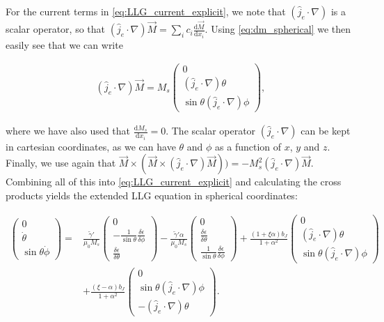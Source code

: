 \documentclass[1p]{elsarticle}		%
\numberwithin{equation}{section}
\begin{document}
For the current terms in \eqref{eq:LLG_current_explicit}, we note that $(\hat{j}_e\cdot\nabla)$ is a scalar operator, so that $(\hat{j}_e\cdot\nabla)\vec{M} = \sum_i c_i \frac{\textrm{d} \vec{M}}{\textrm{d} x_i}$. Using \eqref{eq:dm_spherical} we then easily see that we can write

\begin{align}
(\hat{j}_e\cdot\nabla)\vec{M} = M_s
\begin{pmatrix}
0 \\ 
(\hat{j}_e\cdot\nabla)\theta \\ 
\sin\theta(\hat{j}_e\cdot\nabla)\phi
\end{pmatrix},
\end{align}

where we have also used that $\frac{\textrm{d} M_s}{\textrm{d} x_i} = 0$. The scalar operator $(\hat{j}_e\cdot\nabla)$ can be kept in cartesian coordinates, as we can have $\theta$ and $\phi$ as a function of $x$, $y$ and $z$. Finally, we use again that $\vec{M}\times (\vec{M}\times(\hat{j}_e\cdot\nabla)\vec{M})) = -M_s^2(\hat{j}_e\cdot\nabla)\vec{M}$. Combining all of this into \eqref{eq:LLG_current_explicit} and calculating the cross products yields the extended LLG equation in spherical coordinates:

\begin{align}
\nonumber \begin{pmatrix}
0 \\ \dot{\theta} \\ \sin\theta\dot{\phi}
\end{pmatrix} =
&\frac{\tilde{\gamma}'}{\mu_0 M_s}
\begin{pmatrix}
0 \\ -\frac{1}{\sin\theta} \frac{\delta \epsilon}{\delta \phi} \\ \frac{\delta \epsilon}{\delta \theta}
\end{pmatrix} - \frac{\tilde{\gamma}' \alpha}{\mu_0 M_s} 
\begin{pmatrix}
0 \\ \frac{\delta \epsilon}{\delta \theta} \\ \frac{1}{\sin\theta} \frac{\delta \epsilon}{\delta \phi}
\end{pmatrix} + \frac{(1+\xi\alpha)b_J}{1+\alpha^2}
\begin{pmatrix}
0 \\ (\hat{j}_e\cdot\nabla)\theta \\ \sin\theta(\hat{j}_e\cdot\nabla)\phi
\end{pmatrix} \\
&+\frac{(\xi-\alpha)b_J}{1+\alpha^2}
\begin{pmatrix}
0 \\ \sin\theta(\hat{j}_e\cdot\nabla)\phi \\ -(\hat{j}_e\cdot\nabla)\theta
\end{pmatrix}.
\label{eq:LLG_current_explicit_spherical}
\end{align}
\end{document}
